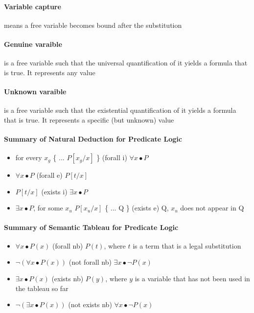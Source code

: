     \paragraph{Variable capture} means a free variable becomes bound after the
    substitution

    \paragraph{Genuine varaible} is a free variable such that the universal
    quantification of it yields a formula that is true. It represents any value

    \paragraph{Unknown varaible} is a free variable such that the existential
    quantification of it yields a formula that is true. It represents a
    specific (but unknown) value

    \paragraph{Summary of Natural Deduction for Predicate Logic}
    \begin{itemize}
      \item for every $x_g$ \{ ... $P[x_g / x]$ \} (forall i) $\forall x
        \bullet P$
      \item $\forall x \bullet P$ (forall e) $P[t/x]$
      \item $P[t/x]$ (exists i) $\exists x \bullet P$
      \item $\exists x \bullet P$, for some $x_u$ $P[x_u/x]$ \{ ... Q \}
        (exists e) Q, $x_u$ does not appear in Q
    \end{itemize}

    \paragraph{Summary of Semantic Tableau for Predicate Logic}
    \begin{itemize}
      \item $\forall x \bullet P(x)$ (forall nb) $P(t)$, where $t$ is a term
        that is a legal substitution
      \item $\lnot(\forall x \bullet P(x))$ (not forall nb) $\exists x \bullet
        \lnot P(x)$
      \item $\exists x \bullet P(x)$ (exists nb) $P(y)$, where $y$ is a
        variable that has not been used in the tableau so far
      \item $\lnot(\exists x \bullet P(x))$ (not exists nb) $\forall x \bullet
        \lnot P(x)$
    \end{itemize}
